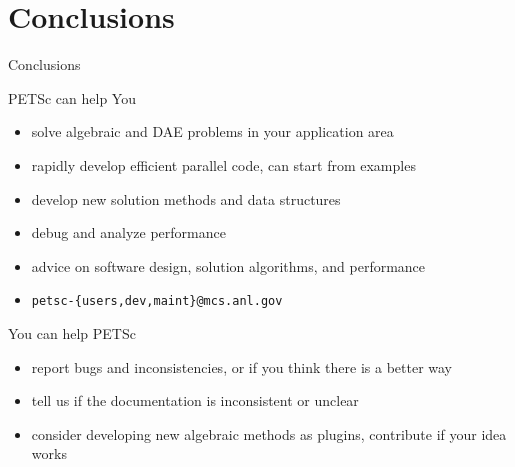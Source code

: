















%
%
\section{Conclusions}
\begin{frame}{Conclusions}
 
 \begin{block}{PETSc can help You}
  \begin{itemize}
   \item solve algebraic and DAE problems in your application area
   \item rapidly develop efficient parallel code, can start from examples
   \item develop new solution methods and data structures
   \item debug and analyze performance
   \item advice on software design, solution algorithms, and performance
   \item \centering \texttt{petsc-\{users,dev,maint\}@mcs.anl.gov}

  \end{itemize}
 \end{block}

 \begin{block}{You can help PETSc}
  \begin{itemize}
   \item report bugs and inconsistencies, or if you think there is a better way
   \item tell us if the documentation is inconsistent or unclear
   \item consider developing new algebraic methods as plugins, contribute if your idea works
  \end{itemize}
 \end{block}

\end{frame}
